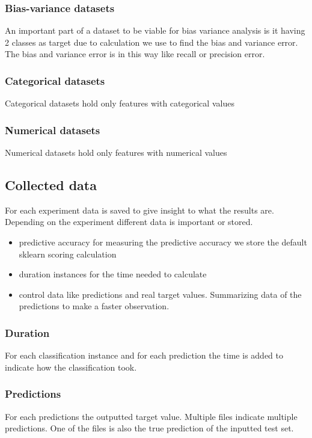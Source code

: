 \documentclass[a4paper,10pt]{article}
\begin{document}
\subsubsection{Bias-variance datasets}
An important part of a dataset to be viable for bias variance analysis is it having 2 classes as target due to calculation we use to find the bias and variance error. The bias and variance error is in this way like recall or precision error.  %
\subsubsection{Categorical datasets}
Categorical datasets hold only features with categorical values
\subsubsection{Numerical datasets}
Numerical datasets hold only features with numerical values
\subsection{Collected data}
For each experiment data is saved to give insight to what the results are. Depending on the experiment different data is important or stored. 
\begin{itemize}
	\item predictive accuracy for measuring the predictive accuracy we store the default sklearn scoring calculation
	\item duration instances for the time needed to calculate 
	\item control data like predictions and real target values. Summarizing data of the predictions to make a faster observation. 
\end{itemize}
\subsubsection{Duration}
For each classification instance and for each prediction the time is added to indicate how the classification took. 

\subsubsection{Predictions}\label{pred}
For each predictions the outputted target value. Multiple files indicate multiple predictions. One of the files is also the true prediction of the inputted test set. 
\end{document}

